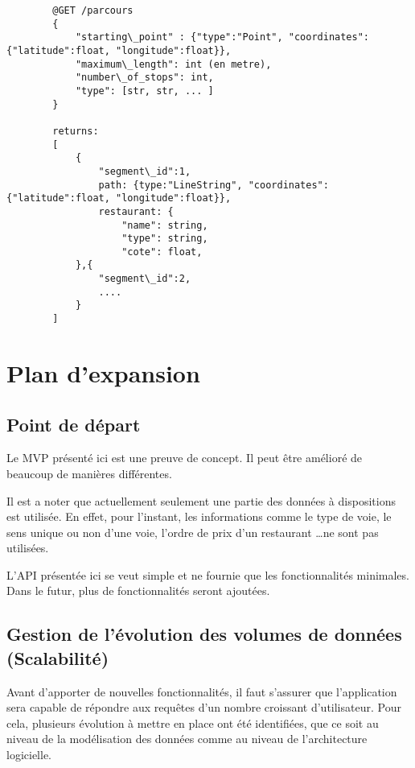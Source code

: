 \documentclass[11pt,a4paper]{article}
\begin{document}
    \begin{lstlisting}
        @GET /parcours
        {
            "starting\_point" : {"type":"Point", "coordinates":{"latitude":float, "longitude":float}},
            "maximum\_length": int (en metre),
            "number\_of_stops": int,
            "type": [str, str, ... ]
        }

        returns:
        [
            {
                "segment\_id":1,
                path: {type:"LineString", "coordinates":{"latitude":float, "longitude":float}},
                restaurant: {
                    "name": string,
                    "type": string,
                    "cote": float,
            },{
                "segment\_id":2,
                ....   
            }
        ]
    \end{lstlisting}
    
\section{Plan d'expansion}

\subsection{Point de départ}

    Le MVP présenté ici est une preuve de concept. Il peut être amélioré de beaucoup de manières différentes.

    Il est a noter que actuellement seulement une partie des données à dispositions est utilisée. En effet, pour l'instant, les informations comme le type de voie, le sens unique ou non d'une voie, l'ordre de prix d'un restaurant \dots ne sont pas utilisées.

    L'API présentée ici se veut simple et ne fournie que les fonctionnalités minimales. Dans le futur, plus de fonctionnalités seront ajoutées.

\subsection{Gestion de l'évolution des volumes de données (Scalabilité)}

    Avant d'apporter de nouvelles fonctionnalités, il faut s'assurer que l'application sera capable de répondre aux requêtes d'un nombre croissant d'utilisateur. Pour cela, plusieurs évolution à mettre en place ont été identifiées, que ce soit au niveau de la modélisation des données comme au niveau de l'architecture logicielle.
\end{document}
